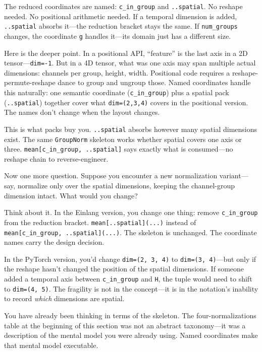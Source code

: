 \documentclass[11pt,titlepage]{article}
\begin{document}
The reduced coordinates are named: \texttt{c\_in\_group} and
\texttt{..spatial}. No reshape needed. No positional arithmetic needed.
If a temporal dimension is added, \texttt{..spatial} absorbs it---the
reduction bracket stays the same. If \texttt{num\_groups} changes, the
coordinate \texttt{g} handles it---its domain just has a different size.

Here is the deeper point. In a positional API, ``feature'' is the last
axis in a 2D tensor---\texttt{dim=-1}. But in a 4D tensor, what was one
axis may span multiple actual dimensions: channels per group, height,
width. Positional code requires a reshape-permute-reshape dance to group
and ungroup those. Named coordinates handle this naturally: one semantic
coordinate (\texttt{c\_in\_group}) plus a spatial pack
(\texttt{..spatial}) together cover what \texttt{dim=(2,3,4)} covers in
the positional version. The names don't change when the layout changes.

This is what packs buy you. \texttt{..spatial} absorbs however many
spatial dimensions exist. The same \texttt{GroupNorm} skeleton works
whether spatial covers one axis or three.
\texttt{mean{[}c\_in\_group,\ ..spatial{]}} says exactly what is
consumed---no reshape chain to reverse-engineer.

Now one more question. Suppose you encounter a new normalization
variant---say, normalize only over the spatial dimensions, keeping the
channel-group dimension intact. What would you change?

Think about it. In the Einlang version, you change one thing: remove
\texttt{c\_in\_group} from the reduction bracket.
\texttt{mean{[}..spatial{]}(...)} instead of
\texttt{mean{[}c\_in\_group,\ ..spatial{]}(...)}. The skeleton is
unchanged. The coordinate names carry the design decision.

In the PyTorch version, you'd change \texttt{dim=(2,\ 3,\ 4)} to
\texttt{dim=(3,\ 4)}---but only if the reshape hasn't changed the
position of the spatial dimensions. If someone added a temporal axis
between \texttt{c\_in\_group} and \texttt{H}, the tuple would need to
shift to \texttt{dim=(4,\ 5)}. The fragility is not in the concept---it
is in the notation's inability to record \emph{which} dimensions are
spatial.

You have already been thinking in terms of the skeleton. The
four-normalizations table at the beginning of this section was not an
abstract taxonomy---it was a description of the mental model you were
already using. Named coordinates make that mental model executable.
\end{document}
